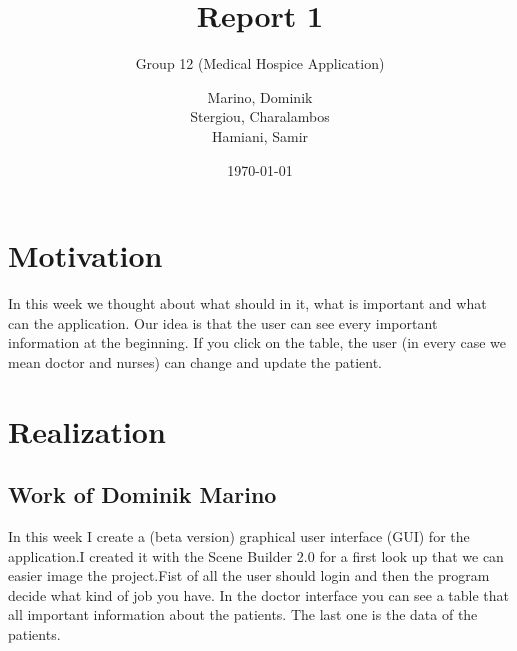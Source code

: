 \documentclass{scrartcl}
\begin{document}
\subject{Weekly Report of OOP-Project SS17---Biemann}
\title{Report 1}%
\subtitle{Group 12 (Medical Hospice Application)}
\author{Marino, Dominik\\Stergiou, Charalambos\\ Hamiani, Samir}%
\date{\today}
\maketitle


\section{Motivation}
In this week we thought about what should in it, what is important and what can  the application.  Our idea is that the user can see every important information at the beginning. If you click on the table, the user (in every case we mean doctor and nurses) can change and update the patient.

\section{Realization}
\subsection{Work of Dominik Marino}
In this week I create a (beta version) graphical user interface (GUI) for the application.I created it with the Scene Builder 2.0 for a first look up that we can easier image the project.Fist of all the user should login and then the program decide what kind of job you have. In the doctor interface you can see a table that all important information about the patients. The last one is the data of the patients.

\end{document}
